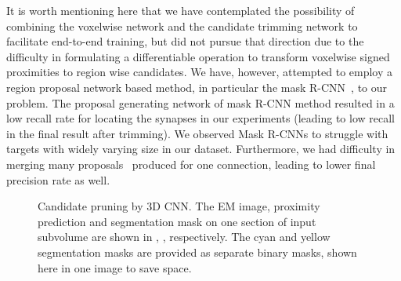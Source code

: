 \documentclass{llncs}
\begin{document}
It is worth mentioning here that we have contemplated the possibility of combining the voxelwise network and the candidate trimming network to facilitate end-to-end training, but did not pursue that direction due to the difficulty in formulating a differentiable operation to transform voxelwise signed proximities to region wise candidates. We have, however, attempted to employ a region proposal network based method, in particular the mask R-CNN~\cite{he2017maskrcnn}, to our problem. The proposal generating network of mask R-CNN method resulted in a low recall rate for locating the  synapses in our experiments (leading to low recall in the final result after trimming). We observed Mask R-CNNs to struggle with targets with widely varying size in our dataset. Furthermore, we had difficulty in merging many proposals~\cite{he2017maskrcnn} produced for one connection, leading to lower final precision rate as well. 
\begin{figure*}[t]
\vspace{-0.2cm}
\begin{center}
\vspace{-0.2cm}
\vspace{-0.4cm}
\caption{\scriptsize Candidate pruning by 3D CNN. The EM image,  proximity prediction and segmentation mask on one section of input subvolume are shown in , ,   respectively. The cyan and yellow segmentation masks are provided as separate binary masks, shown here in one image  to save space.}\label{F:PRUNE}
\end{center}
\vspace{-0.4cm}
\end{figure*}
\end{document}
